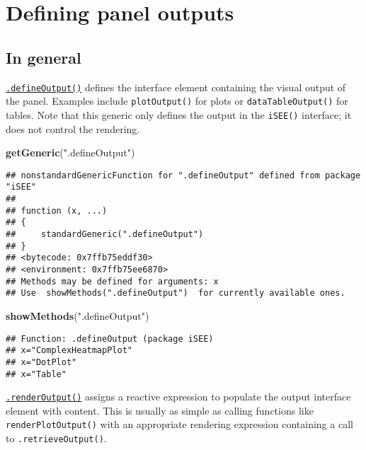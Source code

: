 \documentclass[
]{book}
\newenvironment{Shaded}{\begin{snugshade}}{\end{snugshade}}
\newcommand{\KeywordTok}[1]{\textcolor[rgb]{0.13,0.29,0.53}{\textbf{#1}}}
\newcommand{\NormalTok}[1]{#1}
\newcommand{\StringTok}[1]{\textcolor[rgb]{0.31,0.60,0.02}{#1}}
\begin{document}
\hypertarget{defining-panel-outputs}{%
\section{Defining panel outputs}\label{defining-panel-outputs}}

\hypertarget{in-general-1}{%
\subsection{In general}\label{in-general-1}}

\href{https://isee.github.io/iSEE/reference/output-generics.html}{\texttt{.defineOutput()}} defines the interface element containing the visual output of the panel.
Examples include \texttt{plotOutput()} for plots or \texttt{dataTableOutput()} for tables.
Note that this generic only defines the output in the \texttt{iSEE()} interface; it does not control the rendering.

\begin{Shaded}
\begin{Highlighting}[]
\KeywordTok{getGeneric}\NormalTok{(}\StringTok{".defineOutput"}\NormalTok{)}
\end{Highlighting}
\end{Shaded}

\begin{verbatim}
## nonstandardGenericFunction for ".defineOutput" defined from package "iSEE"
## 
## function (x, ...) 
## {
##     standardGeneric(".defineOutput")
## }
## <bytecode: 0x7ffb75eddf30>
## <environment: 0x7ffb75ee6870>
## Methods may be defined for arguments: x
## Use  showMethods(".defineOutput")  for currently available ones.
\end{verbatim}

\begin{Shaded}
\begin{Highlighting}[]
\KeywordTok{showMethods}\NormalTok{(}\StringTok{".defineOutput"}\NormalTok{)}
\end{Highlighting}
\end{Shaded}

\begin{verbatim}
## Function: .defineOutput (package iSEE)
## x="ComplexHeatmapPlot"
## x="DotPlot"
## x="Table"
\end{verbatim}

\href{https://isee.github.io/iSEE/reference/output-generics.html}{\texttt{.renderOutput()}} assigns a reactive expression to populate the output interface element with content.
This is usually as simple as calling functions like \texttt{renderPlotOutput()} with an appropriate rendering expression containing a call to \texttt{.retrieveOutput()}.
\end{document}
